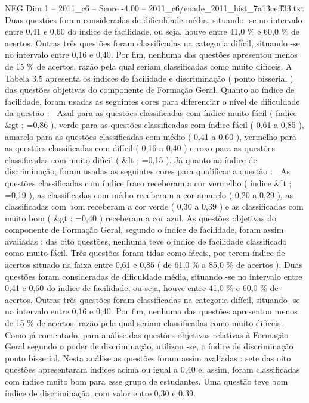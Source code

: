 \begin{textsample}{NEG Dim 1 – 2011\_c6 – Score -4.00 – 2011\_c6/enade\_2011\_hist\_7a13ceff33.txt}
Duas questões foram consideradas de dificuldade média, situando -se no intervalo entre 0,41 e 0,60 do índice de facilidade, ou seja, houve entre 41,0 \% e 60,0 \% de acertos.
Outras três questões foram classificadas na categoria difícil, situando -se no intervalo entre 0,16 e 0,40.
Por fim, nenhuma das questões apresentou menos de 15 \% de acertos, razão pela qual seriam classificadas como muito difíceis.
A Tabela 3.5 apresenta os índices de facilidade e discriminação ( ponto bisserial ) das questões objetivas do componente de Formação Geral.
Quanto ao índice de facilidade, foram usadas as seguintes cores para diferenciar o nível de dificuldade da questão :  Azul para as questões classificadas com índice muito fácil ( índice \&gt ; =0,86 ), verde para as questões classificadas com índice fácil ( 0,61 a 0,85 ), amarelo para as questões classificadas com médio ( 0,41 a 0,60 ), vermelho para as questões classificadas com difícil ( 0,16 a 0,40 ) e roxo para as questões classificadas com muito difícil ( \&lt ; =0,15 ).
Já quanto ao índice de discriminação, foram usadas as seguintes cores para qualificar a questão :  As questões classificadas com índice fraco receberam a cor vermelho ( índice \&lt ; =0,19 ), as classificadas com médio receberam a cor amarelo ( 0,20 a 0,29 ), as classificadas com bom receberam a cor verde ( 0,30 a 0,39 ) e as classificadas com muito bom ( \&gt ; =0,40 ) receberam a cor azul.
As questões objetivas do componente de Formação Geral, segundo o índice de facilidade, foram assim avaliadas : das oito questões, nenhuma teve o índice de facilidade classificado como muito fácil.
Três questões foram tidas como fáceis, por terem índice de acertos situado na faixa entre 0,61 e 0,85 ( de 61,0 \% a 85,0 \% de acertos ).
Duas questões foram consideradas de dificuldade média, situando -se no intervalo entre 0,41 e 0,60 do índice de facilidade, ou seja, houve entre 41,0 \% e 60,0 \% de acertos.
Outras três questões foram classificadas na categoria difícil, situando -se no intervalo entre 0,16 e 0,40.
Por fim, nenhuma das questões apresentou menos de 15 \% de acertos, razão pela qual seriam classificadas como muito difíceis.
Como já comentado, para análise das questões objetivas relativas à Formação Geral segundo o poder de discriminação, utilizou -se, o índice de discriminação ponto bisserial.
Nesta análise as questões foram assim avaliadas : sete das oito questões apresentaram índices acima ou igual a 0,40 e, assim, foram classificadas com índice muito bom para esse grupo de estudantes.
Uma questão teve bom índice de discriminação, com valor entre 0,30 e 0,39.

\end{textsample}
